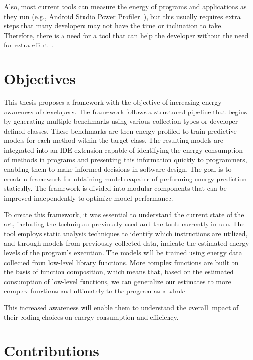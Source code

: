 Also, most current tools can measure the energy of programs and applications as they run (e.g., Android Studio Power Profiler~\cite{android_power_profiler}), but this usually requires extra steps that many developers may not have the time or inclination to take. Therefore, there is a need for a tool that can help the developer without the need for extra effort~\cite{10.1145/3154384}.

\section{Objectives}


This thesis proposes a framework with the objective of increasing energy awareness of developers. The framework follows a structured pipeline that begins by generating multiple benchmarks using various collection types or developer-defined classes. These benchmarks are then energy-profiled to train predictive models for each method within the target class.
The resulting models are integrated into an IDE extension capable of identifying the energy consumption of methods in programs and presenting this information quickly to programmers, enabling them to make informed decisions in software design. The goal is to create a framework for obtaining models capable of performing energy prediction statically. The framework is divided into modular components that can be improved independently to optimize model performance.


To create this framework, it was essential to understand the current state of the art, including the techniques previously used and the tools currently in use. The tool employs static analysis techniques to identify which instructions are utilized, and through models from previously collected data, indicate the estimated energy levels of the program's execution. The models will be trained using energy data collected from low-level library functions. More complex functions are built on the basis of function composition, which means that, based on the estimated consumption of low-level functions, we can generalize our estimates to more complex functions and ultimately to the program as a whole. 

This increased awareness will enable them to understand the overall impact of their coding choices on energy consumption and efficiency.



\section{Contributions}

